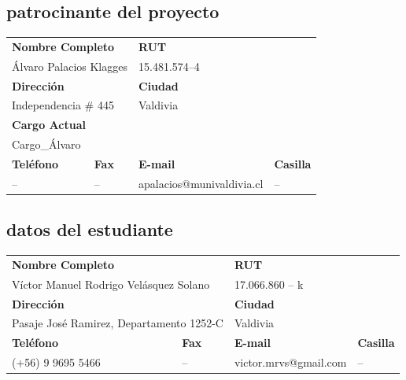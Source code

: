 \documentclass[12pt]{article}
\begin{document}
\subsection{patrocinante del proyecto}
\begin{table}[h]
	\centering
	\begin{tabular}{|p{3.4cm}|p{3.4cm}|p{4.4cm}|p{2.4cm}|}
        \hline
        \multicolumn{2}{|l}{\textbf{Nombre Completo}} &
        \multicolumn{2}{|l|}{\textbf{RUT}} \\
        \multicolumn{2}{|l}{Álvaro Palacios Klagges} &
        \multicolumn{2}{|l|}{15.481.574--4} \\ \hline
        \multicolumn{2}{|l}{\textbf{Dirección}} &
        \multicolumn{2}{|l|}{\textbf{Ciudad}} \\
        \multicolumn{2}{|l}{Independencia \# 445} &
        \multicolumn{2}{|l|}{Valdivia} \\ \hline
        \multicolumn{4}{|l|}{\textbf{Cargo Actual}}\\
        \multicolumn{4}{|l|}{Cargo\_Álvaro}\\ \hline
        \textbf{Teléfono} & \textbf{Fax} & \textbf{E-mail} & \textbf{Casilla} \\
        -- & -- & apalacios@munivaldivia.cl & -- \\ \hline
	\end{tabular}
\end{table}
\subsection{datos del estudiante}
\begin{table}[h]
	\centering
	\begin{tabular}{|p{3.4cm}|p{3.4cm}|p{4.0cm}|p{2.8cm}|}
        \hline
        \multicolumn{2}{|l|}{\textbf{Nombre Completo}} &
        \multicolumn{2}{l|}{\textbf{RUT}} \\
        \multicolumn{2}{|l|}{Víctor Manuel Rodrigo Velásquez Solano} & 
        \multicolumn{2}{l|}{17.066.860 -- k} \\ \hline
        \multicolumn{2}{|l|}{\textbf{Dirección}} & 
        \multicolumn{2}{l|}{\textbf{Ciudad}} \\
        \multicolumn{2}{|l|}{Pasaje José Ramirez, Departamento 1252-C} & 
        \multicolumn{2}{l|}{Valdivia} \\ \hline
        \textbf{Teléfono} & \textbf{Fax} & \textbf{E-mail} &
        \textbf{Casilla} \\
        (+56) 9 9695 5466 & -- & victor.mrvs@gmail.com & -- \\ \hline
	\end{tabular}
\end{table}
\end{document}
